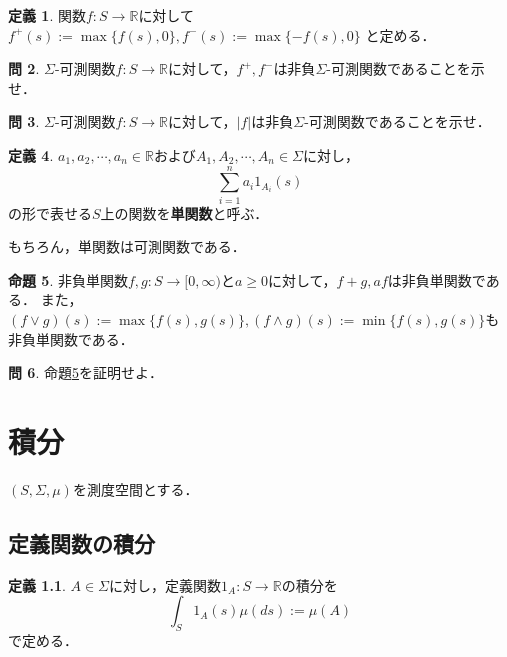 \documentclass{jsreport}
\theoremstyle{definition}
\newtheorem{defi}{定義}[section]
\newtheorem{prop}[defi]{命題}
\newtheorem{qst}[defi]{問}
\begin{document}
\begin{defi}\label{def_positive_and_negative_part}
関数$f \colon S\to\mathbb{R}$に対して
$f^+(s):=\max\{f(s),0\}, f^-(s):=\max\{-f(s),0\}$
と定める．
\end{defi}

\begin{qst}\label{qst_positive_and_negative_part_are_measurable}
$\Sigma$-可測関数$f \colon S\to\mathbb{R}$に対して，$f^+,f^-$は非負$\Sigma$-可測関数であることを示せ．
\end{qst}

\begin{qst}\label{qst_absolute_is_measurable}
$\Sigma$-可測関数$f \colon S\to\mathbb{R}$に対して，$|f|$は非負$\Sigma$-可測関数であることを示せ．
\end{qst}

\begin{defi}\label{def_simple_function}
$a_1,a_2,\cdots,a_n\in\mathbb{R}$および$A_1,A_2,\cdots,A_n\in\Sigma$に対し，
\[ \sum_{i=1}^n a_i1_{A_i}(s) \]
の形で表せる$S$上の関数を\textbf{単関数}と呼ぶ．
\end{defi}

もちろん，単関数は可測関数である．

\begin{prop}\label{prop_properties_of_nonnegative_simple_function}
非負単関数$f,g \colon S\to[0,\infty)$と$a\geq0$に対して，$f+g, af$は非負単関数である．
また，$(f \vee g)(s):=\max\{f(s),g(s)\}, (f \wedge g)(s):=\min\{f(s),g(s)\}$も非負単関数である．
\end{prop}

\begin{qst}\label{qst_proof_of_properties_of_nonnegative_simple_function}
命題\ref{prop_properties_of_nonnegative_simple_function}を証明せよ．
\end{qst}

\chapter{積分}

$(S,\Sigma,\mu)$を測度空間とする．

\section{定義関数の積分}

\begin{defi}\label{def_indicator_function_integral}
$A\in\Sigma$に対し，定義関数$1_A \colon S\to\mathbb{R}$の積分を
\[ \int_S 1_A(s)\mu(ds):=\mu(A) \]
で定める．
\end{defi}
\end{document}

